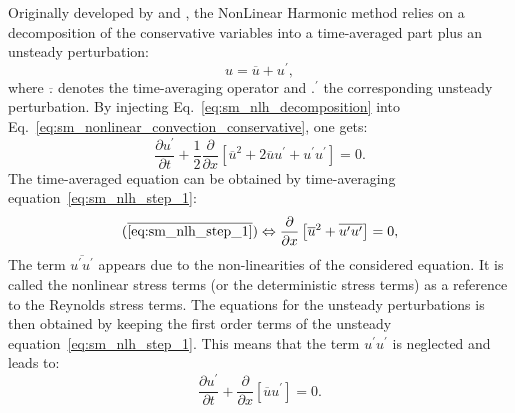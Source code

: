 
Originally developed by \citet{He1998} and \citet{Ning1998},
the 
NonLinear Harmonic method
relies on a decomposition of the conservative variables into a
time-averaged part plus an unsteady perturbation:
\begin{equation}
	u = \overline{u} + u^\prime,
	\label{eq:sm_nlh_decomposition}
\end{equation}
where $\overline{.}$ denotes the time-averaging operator and
$.^\prime$ the corresponding unsteady perturbation.
By injecting Eq.~\ref{eq:sm_nlh_decomposition} into
Eq.~\ref{eq:sm_nonlinear_convection_conservative}, one gets:
\begin{equation}
	\frac{\partial u^\prime}{\partial t} + 
	\frac{1}{2}\frac{\partial}{\partial x} \left[
	\overline{u}^2 + 2 \overline{u} u^\prime + u^\prime u^\prime \right] = 
	0.
	\label{eq:sm_nlh_step_1}
\end{equation}
The time-averaged equation can be obtained by time-averaging
equation~\ref{eq:sm_nlh_step_1}:
\begin{equation}
	(\overline{\ref{eq:sm_nlh_step_1}})
	\Leftrightarrow
	\frac{\partial}{\partial x}
	\left[\overline{u}^2 + 
	\overline{u^\prime u^\prime}\right] =
	0,
	\label{eq:sm_nlh_step_2}
\end{equation}
The term $\overline{u^\prime u^\prime}$
appears due to the non-linearities of the considered equation. It
is called the nonlinear stress terms 
(or the deterministic stress terms) as a reference to 
the Reynolds stress terms. 
The equations for the unsteady perturbations is then obtained by keeping
the first order terms of the unsteady equation~\ref{eq:sm_nlh_step_1}.
This means that the term $u^\prime u^\prime$ is neglected and leads
to:
\begin{equation}
	\frac{\partial u^\prime}{\partial t} + 
	\frac{\partial}{\partial x} \left[\overline{u} u^\prime \right] = 
	0.
\end{equation}

